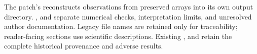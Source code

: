 The patch's  reconstructs observations from preserved arrays into its own output directory. ,  and  separate numerical checks, interpretation limits, and unresolved author documentation. Legacy file names are retained only for traceability; reader-facing sections use scientific descriptions. Existing ,  and  retain the complete historical provenance and adverse results.
